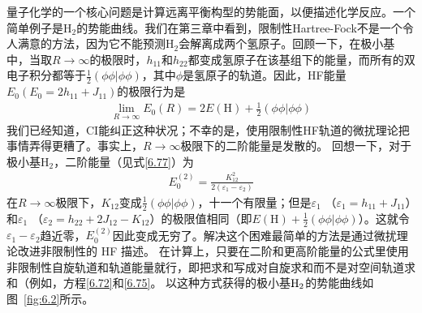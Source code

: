 量子化学的一个核心问题是计算远离平衡构型的势能面，以便描述化学反应。一个简单例子是$\mathrm{H_2}$的势能曲线。我们在第三章中看到，限制性Hartree-Fock不是一个令人满意的方法，因为它不能预测$\mathrm{H_2}$会解离成两个氢原子。回顾一下，在极小基中，当取$R\to\infty$的极限时，$h_{11}$和$h_{22}$都变成氢原子在该基组下的能量，而所有的双电子积分都等于$\frac{1}{2}(\phi\phi|\phi\phi)$，其中$\phi$是氢原子的轨道。因此，HF能量$E_0(E_0=2h_{11}+J_{11})$的极限行为是
\begin{align}
	\lim_{R\to\infty} E_0(R) = 2E(\mathrm{H}) + \frac{1}{2}(\phi\phi|\phi\phi)
\end{align}
我们已经知道，CI能纠正这种状况；不幸的是，使用限制性HF轨道的微扰理论把事情弄得更糟了。事实上，$R\to\infty$极限下的二阶能量是发散的。 回想一下，对于极小基$\mathrm{H_2}$，二阶能量（见式\eqref{6.77}）为
\begin{align}
	E_0^{(2)}  = \frac{K_{12}^2}{2(\varepsilon_1 - \varepsilon_2)}
\end{align}
在$R\to\infty$极限下，$K_{12}$变成$\frac{1}{2}(\phi\phi|\phi\phi)$，十一个有限量；但是$\varepsilon_1$ （$\varepsilon_1=h_{11}+J_{11}$）和$\varepsilon_1$ （$\varepsilon_2=h_{22}+2J_{12}-K_{12}$）的极限值相同（即$E(\mathrm{H})+\frac{1}{2}(\phi\phi|\phi\phi)$）。这就令$\varepsilon_1-\varepsilon_2$趋近零，$E_0^{(2)}$因此变成无穷了。解决这个困难最简单的方法是通过微扰理论改进非限制性的 HF 描述。 在计算上，只要在二阶和更高阶能量的公式里使用非限制性自旋轨道和轨道能量就行，即把求和写成对自旋求和而不是对空间轨道求和（例如，方程\eqref{6.72}和\eqref{6.75}。 以这种方式获得的极小基$\mathrm{H}_2$的势能曲线如图~\ref{fig:6.2}所示。
